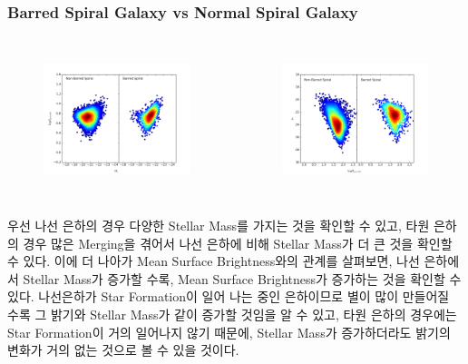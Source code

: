 \documentclass[xcolor={dvipsnames,table}]{beamer}
\newcommand\SSM{\fontsize{7}{7.2}\selectfont}
\begin{document}
\begin{frame}
 \frametitle{Barred Spiral Galaxy vs Normal Spiral Galaxy}
 \SSM
 \begin{columns}[t]
   \begin{figure}
    \centering
    \includegraphics[width=6cm, height=4cm]{sizemagdensity2.png}
   \end{figure}
   \begin{figure}
    \centering
    \includegraphics[width=6cm, height=4cm]{sizesurfdensity2.png}
   \end{figure}
  \end{columns}
\vspace{0.3cm}
우선 나선 은하의 경우 다양한 Stellar Mass를 가지는 것을 확인할 수 있고, 타원 은하의 경우 많은 Merging을 겪어서 나선 은하에
비해 Stellar Mass가 더 큰 것을 확인할 수 있다. 이에 더 나아가 Mean Surface Brightness와의 관계를 살펴보면, 나선 은하에서
Stellar Mass가 증가할 수록, Mean Surface Brightness가 증가하는 것을 확인할 수 있다. 나선은하가 Star Formation이 일어
나는 중인 은하이므로 별이 많이 만들어질 수록 그 밝기와 Stellar Mass가 같이 증가할 것임을 알 수 있고, 타원 은하의 경우에는
Star Formation이 거의 일어나지 않기 때문에, Stellar Mass가 증가하더라도 밝기의 변화가 거의 없는 것으로 볼 수 있을 것이다.
\end{frame}
\end{document}
